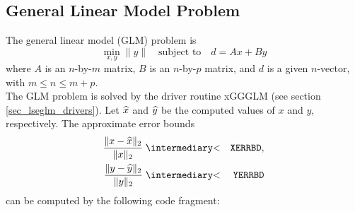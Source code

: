 \subsection{General Linear Model Problem}

The general linear model (GLM) problem is
$$      \min_{x,y} \|y\| \quad \mbox{subject to} \quad d = Ax + By     $$
where $A$ is an $n$-by-$m$ matrix, $B$ is an $n$-by-$p$ matrix, and $d$
is a given $n$-vector, with $m \leq n \leq m+p$.   \\

\noindent
The GLM problem is solved by the driver routine xGGGLM
(see section \ref{sec_lseglm_drivers}).
Let $\widehat{x}$ and $\widehat{y}$ be the computed values of $x$ and $y$, respectively.
The approximate error bounds
\begin{eqnarray*}
     \frac{ \| x - \ha{x} \|_2 }{ \| x \|_2 } & \lapproxeq & {\tt XERRBD},  \\
     \frac{ \| y - \ha{y} \|_2 }{ \| y \|_2 } & \lapproxeq & {\tt YERRBD}
\end{eqnarray*}
can be computed by the following code fragment:

